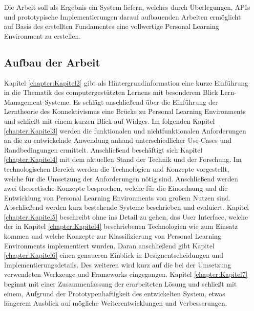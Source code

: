 Die Arbeit soll als Ergebnis ein System liefern, welches durch Überlegungen, APIs und prototypische Implementierungen darauf aufbauenden Arbeiten ermöglicht auf Basis des erstellten Fundamentes eine vollwertige Personal Learning Environment zu erstellen.

\subsection{Aufbau der Arbeit}
Kapitel \ref{chapter:Kapitel2} gibt als Hintergrundinformation eine kurze Einführung in die Thematik des computergestützten Lernens mit besonderem Blick Lern-Management-Systeme. Es schlägt anschließend über die Einführung der Lerntheorie des Konnektivismus eine Brücke zu Personal Learning Environments und schließt mit einem kurzen Blick auf Widges. Im folgenden Kapitel \ref{chapter:Kapitel3} werden die funktionalen und nichtfunktionalen Anforderungen an die zu entwickelnde Anwendung anhand unterschiedlicher Use-Cases und Randbedingungen ermittelt. Anschließend beschäftigt sich Kapitel \ref{chapter:Kapitel4} mit dem aktuellen Stand der Technik und der Forschung. Im technologischen Bereich werden die Technologien und Konzepte vorgestellt, welche für die Umsetzung der Anforderungen nötig sind. Anschließend werden zwei theoretische Konzepte besprochen, welche für die Einordnung und die Entwicklung von Personal Learning Environments von großem Nutzen sind. Abschließend werden kurz bestehende Systeme beschrieben und evaluiert. Kapitel \ref{chapter:Kapitel5} beschreibt ohne ins Detail zu gehen, das User Interface, welche der in Kapitel \ref{chapter:Kapitel4} beschriebenen Technologien wie zum Einsatz kommen und welche Konzepte zur Klassifizierung von Personal Learning Environments implementiert wurden. Daran anschließend gibt Kapitel \ref{chapter:Kapitel6} einen genaueren Einblick in Designentscheidungen und Implementierungsdetails. Des weiteren wird kurz auf die bei der Umsetzung verwendeten Werkzeuge und Frameworks eingegangen. Kapitel \ref{chapter:Kapitel7} beginnt mit einer Zusammenfassung der erarbeiteten Lösung und schließt mit einem, Aufgrund der Prototypenhaftigkeit des entwickelten System, etwas längerem Ausblick auf mögliche Weiterentwicklungen und Verbesserungen.
